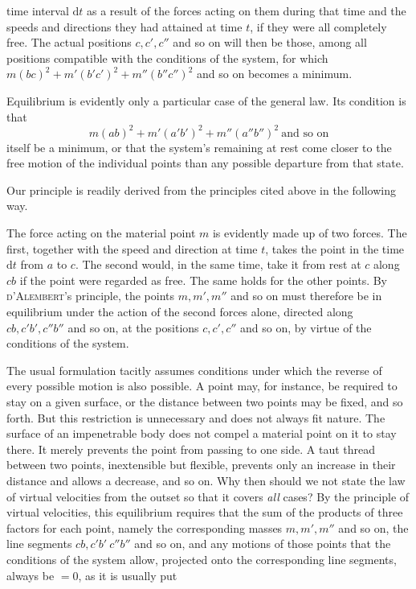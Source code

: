  time interval $\mathrm{d}t$ as a result of the forces acting on them during that time and the speeds and directions they had attained at time $t$, if they were all completely free. The actual positions $c,c',c''$ and so on will then be those, among all positions compatible with the conditions of the system, for which $m(bc)^2+m'(b'c')^2+m''(b''c'')^2$ and so on becomes a minimum.

Equilibrium is evidently only a particular case of the general law. Its condition is that
\[
m(ab)^2+m'(a'b')^2+m''(a''b'')^2\ \text{and so on}
\]
itself be a minimum, or that the system’s remaining at rest come closer to the free motion of the individual points than any possible departure from that state.

Our principle is readily derived from the principles cited above in the following way.

The force acting on the material point $m$ is evidently made up of two forces. The first, together with the speed and direction at time $t$, takes the point in the time $\mathrm{d}t$ from $a$ to $c$. The second would, in the same time, take it from rest at $c$ along $cb$ if the point were regarded as free. The same holds for the other points. By \textsc{d’Alembert}’s principle, the points $m,m',m''$ and so on must therefore be in equilibrium under the action of the second forces alone, directed along $cb,c'b',c''b''$ and so on, at the positions $c,c',c''$ and so on, by virtue of the conditions of the system.

\expandafter\def\csname HistoricalNoteText3\endcsname{The usual formulation tacitly assumes conditions under which the reverse of every possible motion is also possible. A point may, for instance, be required to stay on a given surface, or the distance between two points may be fixed, and so forth. But this restriction is unnecessary and does not always fit nature. The surface of an impenetrable body does not compel a material point on it to stay there. It merely prevents the point from passing to one side. A taut thread between two points, inextensible but flexible, prevents only an increase in their distance and allows a decrease, and so on. Why then should we not state the law of virtual velocities from the outset so that it covers \textit{all} cases?}
By the principle of virtual velocities, this equilibrium requires that the sum of the products of three factors for each point, namely the corresponding masses $m,m',m''$ and so on, the line segments $cb,c'b'\ c''b''$ and so on, and any motions of those points that the conditions of the system allow, projected onto the corresponding line segments, always be $=0$, as it is usually put
